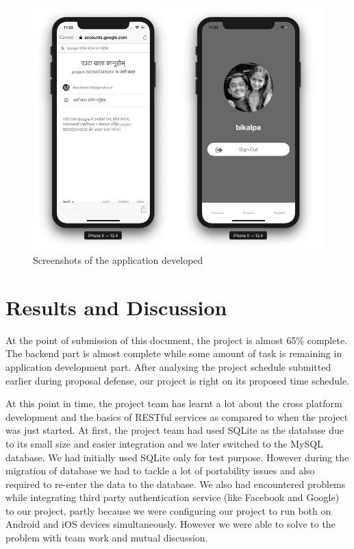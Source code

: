 \documentclass[12pt, a4paper, oneside]{article}
\begin{document}
\begin{figure}[h]
\centering
	\includegraphics[width=\linewidth]{screenshots/3.png}
	\caption{Screenshots of the application developed}
	\label{fig:sc}	
\end{figure}



\pagebreak
\section{Results and Discussion}
At the point of submission of this document, the project is almost 65\% complete. The backend part is almost complete while some amount of task is remaining in application development part. After analysing the project schedule submitted earlier during proposal defense, our project is right on its proposed time schedule.

At this point in time, the project team has learnt a lot about the cross platform development and the basics of RESTful services as compared to when the project was just started. At first, the project team had used SQLite as the database due to its small size and easier integration and we later switched to the MySQL database. We had initially used SQLite only for test purpose. However during the migration of database we had to tackle a lot of portability issues and also required to re-enter the data to the database. We also had encountered problems while integrating third party authentication service (like Facebook and Google) to our project, partly because we were configuring our project to run both on Android and iOS devices simultaneously. However we were able to solve to the problem with team work and mutual discussion.
\end{document}
